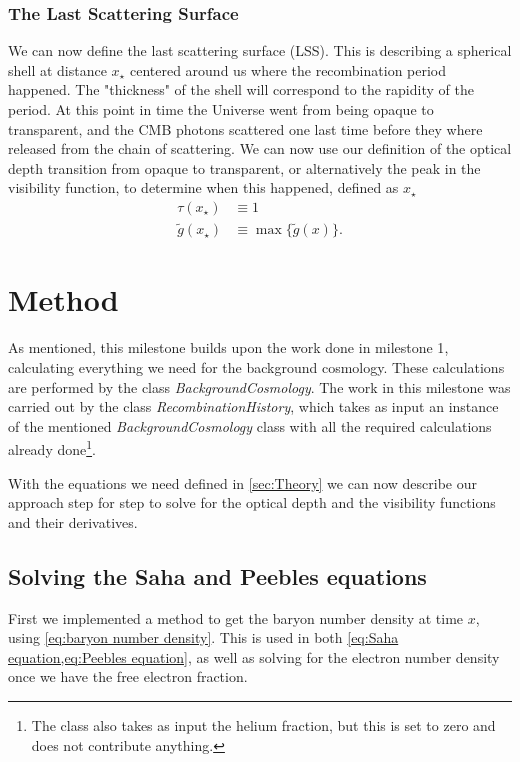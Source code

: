 \documentclass[10pt,a4paper]{article}
\begin{document}
\subsubsection{The Last Scattering Surface}
\label{subsubsec:Theory/last scattering surface}
We can now define the last scattering surface (LSS). This is describing a spherical shell at distance $x_\star$ centered around us where the recombination period happened. The "thickness" of the shell will correspond to the rapidity of the period. At this point in time the Universe went from being opaque to transparent, and the CMB photons scattered one last time before they where released from the chain of scattering. We can now use our definition of the optical depth transition from opaque to transparent, or alternatively the peak in the visibility function, to determine when this happened, defined as $x_\star$
\begin{align*}
    \tau(x_\star) &\equiv 1 \label{eq:tau equiv 1}
    \\
    \tilde{g}(x_\star) &\equiv \max \{\tilde{g}(x)\}.
\end{align*}

\section{Method}
\label{sec:Method}
As mentioned, this milestone builds upon the work done in milestone 1\citep{milestone1}, calculating everything we need for the background cosmology. These calculations are performed by the class \textit{BackgroundCosmology}. The work in this milestone was carried out by the class \textit{RecombinationHistory}, which takes as input an instance of the mentioned \textit{BackgroundCosmology} class with all the required calculations already done\footnote{The class also takes as input the helium fraction, but this is set to zero and does not contribute anything.}.

With the equations we need defined in \cref{sec:Theory} we can now describe our approach step for step to solve for the optical depth and the visibility functions and their derivatives.

\subsection{Solving the Saha and Peebles equations}
\label{subsec:Method/Solving Xe}
First we implemented a method to get the baryon number density at time $x$, using \cref{eq:baryon number density}. This is used in both \cref{eq:Saha equation,eq:Peebles equation}, as well as solving for the electron number density once we have the free electron fraction.
\end{document}
